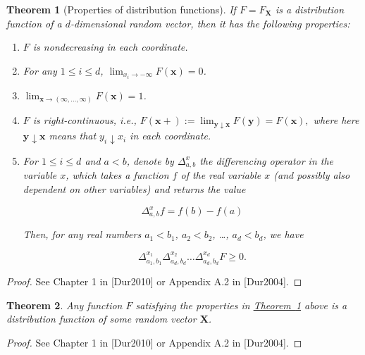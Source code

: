 \documentclass[11pt]{report}
\theoremstyle{plain}
\newtheorem{thm}{Theorem}[chapter]
\theoremstyle{definition}
\begin{document}
\begin{thm}[Properties of distribution functions]
\label{thm-multidim}
If $F=F_{\mathbf X}$ is a distribution function of a
$d$-dimensional random vector, then it has the
following properties:

\begin{enumerate}[label=(\roman*)]
\item $F$ is nondecreasing in each coordinate.

\item For any $1\le i\le d$,
$\lim_{x_i\to-\infty} F(\mathbf{x}) = 0$.

\item $\lim_{\mathbf{x}\to(\infty,\ldots,\infty)}
F(\mathbf{x}) = 1$.

\item $F$ is right-continuous, i.e.,
$F(\mathbf{x}+) := \lim_{\mathbf{y}\downarrow
\mathbf{x}} F(\mathbf{y}) = F(\mathbf{x}),$
where here $\mathbf{y}\downarrow \mathbf{x}$ means
that $y_i\downarrow x_i$ in each coordinate.

\item For $1\le i\le d$ and $a<b$, denote by
$\Delta_{a,b}^{x}$ the \emph{differencing operator in the
variable $x$}, which takes a function $f$ of the real
variable $x$ (and possibly also dependent on other
variables) and returns the value

\[
\Delta_{a,b}^{x}f = f(b) - f(a)
\]

\noindent Then, for any real numbers $a_1 < b_1$, $a_2<b_2$,
\ldots, $a_d < b_d$, we have

\[
\Delta^{x_1}_{a_1,b_1} \Delta^{x_2}_{a_d,b_d}
\ldots \Delta^{x_d}_{a_d,b_d} F \ge 0.
\]
\end{enumerate}

\end{thm}

\begin{proof}
See Chapter 1 in [Dur2010] or Appendix A.2 in
[Dur2004].
\end{proof}

\begin{thm}
Any function $F$ satisfying the properties in \texorpdfstring{\hyperref[thm-multidim]{Theorem~\ref*{thm-multidim}}}{Theorem} above is a distribution function of
some random vector $\mathbf{X}$.
\end{thm}

\begin{proof}
See Chapter 1 in [Dur2010] or Appendix A.2 in
[Dur2004].
\end{proof}
\end{document}
